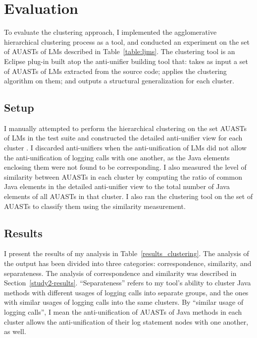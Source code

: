 \section{Evaluation} \label{clustering-assessment}
To evaluate the clustering approach, I implemented the agglomerative hierarchical clustering process as a tool, and conducted an experiment on the set of AUASTs of LMs described in Table~\ref{table:ljms}. The clustering tool is an Eclipse plug-in built atop the anti-unifier building tool that: takes as input a set of AUASTs of LMs extracted from the source code; applies the clustering algorithm on them; and outputs a structural generalization for each cluster.


\subsection{Setup}  \label{study3-setup}
I manually attempted to perform the hierarchical clustering on the set AUASTs of LMs in the test suite and constructed the detailed anti-unifier view for each cluster . I discarded anti-unifiers when the anti-unification of LMs did not allow the anti-unification of logging calls with one another, as the Java elements enclosing them were not found to be corresponding. I also measured the level of similarity between AUASTs in each cluster by computing the ratio of common Java elements in the detailed anti-unifier view to the total number of Java elements of all AUASTs in that cluster. I also ran the clustering tool on the set of AUASTs to classify them using the similarity measurement.

\subsection{Results}  \label{study3-results}
I present the results of my analysis in Table~\ref{results_clustering}. The analysis of the output has been divided into three categories: correspondence, similarity, and separateness. The analysis of correspondence and similarity was described in Section~\ref{study2-results}. ``Separateness'' refers to my tool's ability to cluster Java methods with different usages of logging calls into separate groups, and the ones with similar usages of logging calls into the same clusters.  By ``similar usage of logging calls'', I mean the anti-unification of AUASTs of Java methods in each cluster allows the anti-unification of their log statement nodes with one another, as well.

